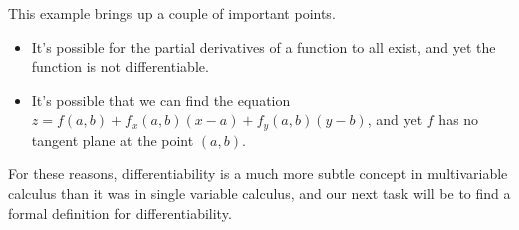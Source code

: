 \documentclass{ximera}
\begin{document}
This example brings up a couple of important points.
\begin{itemize}
\item It's possible for the partial derivatives of a function to all exist, and yet the function is not differentiable.
\item It's possible that we can find the equation $z =f(a,b)+f_x(a,b)(x-a)+f_y(a,b)(y-b)$, and yet $f$ has no tangent plane at the point $(a,b)$.
\end{itemize}

For these reasons, differentiability is a much more subtle concept in multivariable calculus than it was in single variable calculus, and our next task will be to find a formal definition for differentiability.
\end{document}
